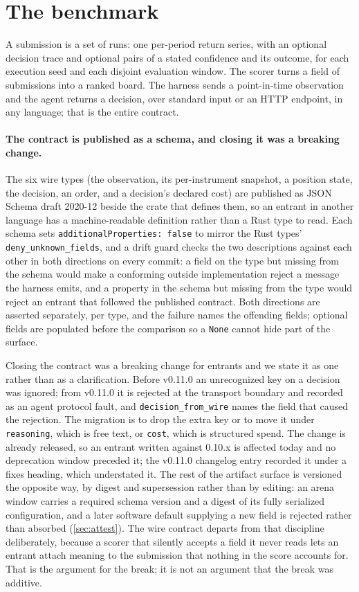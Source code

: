\section{The benchmark}\label{sec:benchmark}

A submission is a set of runs: one per-period return series, with an optional decision trace and optional pairs of a stated confidence and its outcome, for each execution seed and each disjoint evaluation window. The scorer turns a field of submissions into a ranked board. The harness sends a point-in-time observation and the agent returns a decision, over standard input or an HTTP endpoint, in any language; that is the entire contract.

\paragraph{The contract is published as a schema, and closing it was a breaking change.} The six wire types (the observation, its per-instrument snapshot, a position state, the decision, an order, and a decision's declared cost) are published as JSON Schema draft 2020-12 beside the crate that defines them, so an entrant in another language has a machine-readable definition rather than a Rust type to read. Each schema sets \texttt{additionalProperties: false} to mirror the Rust types' \texttt{deny\_unknown\_fields}, and a drift guard checks the two descriptions against each other in both directions on every commit: a field on the type but missing from the schema would make a conforming outside implementation reject a message the harness emits, and a property in the schema but missing from the type would reject an entrant that followed the published contract. Both directions are asserted separately, per type, and the failure names the offending fields; optional fields are populated before the comparison so a \texttt{None} cannot hide part of the surface.

Closing the contract was a breaking change for entrants and we state it as one rather than as a clarification. Before v0.11.0 an unrecognized key on a decision was ignored; from v0.11.0 it is rejected at the transport boundary and recorded as an agent protocol fault, and \texttt{decision\_from\_wire} names the field that caused the rejection. The migration is to drop the extra key or to move it under \texttt{reasoning}, which is free text, or \texttt{cost}, which is structured spend. The change is already released, so an entrant written against 0.10.x is affected today and no deprecation window preceded it; the v0.11.0 changelog entry recorded it under a fixes heading, which understated it. The rest of the artifact surface is versioned the opposite way, by digest and supersession rather than by editing: an arena window carries a required schema version and a digest of its fully serialized configuration, and a later software default supplying a new field is rejected rather than absorbed (\cref{sec:attest}). The wire contract departs from that discipline deliberately, because a scorer that silently accepts a field it never reads lets an entrant attach meaning to the submission that nothing in the score accounts for. That is the argument for the break; it is not an argument that the break was additive.

